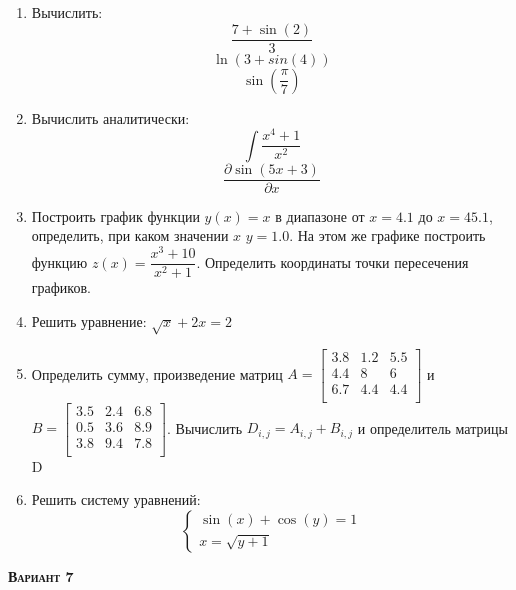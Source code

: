 \begin{enumerate}
\item Вычислить: 
\begin{equation*}\dfrac{7+\sin(2)}{3}              \end{equation*}
\begin{equation*}\ln(3+sin(4))                     \end{equation*}
\begin{equation*}\sin \left( \dfrac{\pi}{7} \right)\end{equation*}

\item Вычислить аналитически: 
 \begin{equation*} \int \dfrac{x^4+1}{x^2} \end{equation*}\begin{equation*} {\dfrac{\partial \sin(5 x +3)}{\partial x}} \end{equation*}
\item Построить график функции $y(x)=x                $ в диапазоне от $x=4.1$ до $x=45.1$, определить, при каком значении $x$ $y=1.0$. На этом же графике построить функцию $z(x)=\dfrac{x^3+10}{x^2+1}     $. Определить координаты точки пересечения графиков. \item Решить уравнение: $\sqrt{x}+2x=2        $

\item Определить сумму, произведение матриц $A=\begin{bmatrix}
3.8 &1.2 &5.5 \\
4.4 &8 &6 \\
6.7 &4.4 &4.4 \\
\end{bmatrix}
$ и $B=\begin{bmatrix}
3.5 &2.4 &6.8 \\
0.5 &3.6 &8.9 \\
3.8 &9.4 &7.8 \\
\end{bmatrix}
$. Вычислить $D_{i,j}=A_{i,j}  +  B_{i,j}$ и определитель матрицы D

\item Решить систему уравнений: \begin{equation*} \begin{cases} \sin(x)+\cos(y)=1    \\ x=\sqrt{y+1}          \end{cases} \end{equation*} 

\end{enumerate}
\textsc{\textbf{Вариант 7}}

